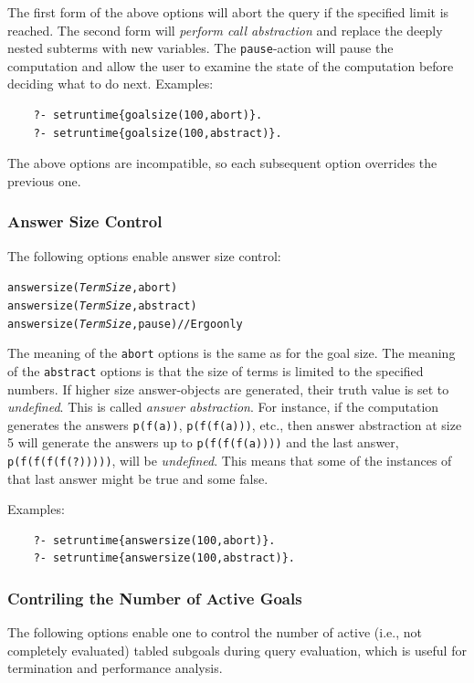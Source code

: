 \documentclass[11pt]{article}
\begin{document}
The first form of the above options
will abort the
query if the specified limit is reached.
The second form will \emph{perform call abstraction} and replace the
deeply nested subterms with new variables. The \texttt{pause}-action will
pause the computation and allow the user to examine the state of the
computation before deciding what to do next.  Examples:
\begin{verbatim}
    ?- setruntime{goalsize(100,abort)}.
    ?- setruntime{goalsize(100,abstract)}.
\end{verbatim}
The above options are incompatible, so each subsequent option overrides the
previous one.


\subsubsection{Answer Size Control}

The following options enable answer size control:
\begin{alltt}
    answersize(\emph{TermSize},abort)
    answersize(\emph{TermSize},abstract)
    answersize(\emph{TermSize},pause)        \textnormal{// Ergo only}
\end{alltt}
The meaning of the \texttt{abort} options is the same as
for the goal size.
The meaning of the \texttt{abstract} options is that the size of
terms is limited to the specified numbers. If higher size
answer-objects are generated, their truth value is set to \emph{undefined}. 
This is called \emph{answer abstraction}.  For instance, if the computation
generates the answers \texttt{p(f(a))}, \texttt{p(f(f(a)))}, etc., then
answer abstraction at  size 5 will generate the answers up to
\texttt{p(f(f(f(a))))} and the last answer, \texttt{p(f(f(f(f(?)))))}, will
be \emph{undefined}. This means that some of the instances of that last
answer might be true and some false.

Examples:
\begin{verbatim}
    ?- setruntime{answersize(100,abort)}.
    ?- setruntime{answersize(100,abstract)}.
\end{verbatim}

\subsubsection{Contriling the Number of Active Goals}

The following options enable one to control the number of active (i.e., not
completely evaluated) tabled subgoals during query evaluation, which is
useful for termination and performance analysis.
\end{document}
